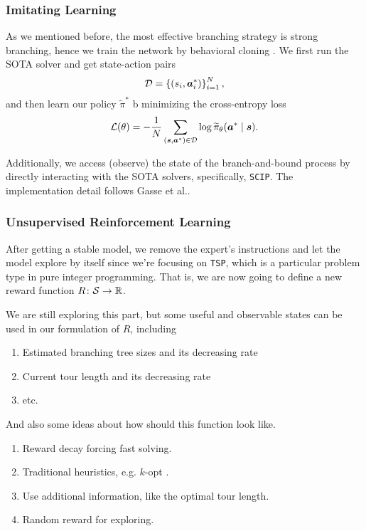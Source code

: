 \documentclass{article}
\begin{document}
\subsubsection{Imitating Learning}
As we mentioned before, the most effective branching strategy is strong branching, hence we train the network by behavioral cloning \cite{Efficient-Training-of-artificial-Neural-Networks-for-Autonomous-Navigation}.
We first run the SOTA solver and get state-action pairs
\[
	\mathcal{\MakeUppercase{d}} = \left\{(s_{i} , \bm{a} _{i} ^\ast)\right\}_{i = 1}^N,
\]
and then learn our policy \(\widetilde{\pi} ^\ast\) b minimizing the cross-entropy loss
\[
	\mathcal{\MakeUppercase{l}} (\theta ) = - \frac{1}{N}\sum\limits_{(\bm{s}, \bm{a}^\ast)\in \mathcal{\MakeUppercase{d}} }\log \widetilde{\pi}_\theta (\bm{a} ^\ast \mid \bm{s} ).
\]

Additionally, we access (observe) the state of the branch-and-bound process by directly interacting with the SOTA solvers, specifically, \texttt{SCIP}. The implementation detail follows Gasse et al.\cite{GasseCFCL19}.

\subsubsection{Unsupervised Reinforcement Learning}
After getting a stable model, we remove the expert's instructions and let the model explore by itself since we're focusing on \texttt{TSP}, which is a particular problem type in pure integer programming. That is, we are now
going to define a new reward function \(R\colon \mathcal{\MakeUppercase{s}} \to \mathbb{\MakeUppercase{r}} \).

We are still exploring this part, but some useful and observable states can be used in our formulation of \(R\), including
\begin{enumerate}
	\item Estimated branching tree sizes and its decreasing rate
	\item Current tour length and its decreasing rate
	\item etc.
\end{enumerate}

And also some ideas about how should this function look like.
\begin{enumerate}
	\item Reward decay forcing fast solving.
	\item Traditional heuristics, e.g. \(k\)-opt \cite{k-opt}.
	\item Use additional information, like the optimal tour length.
	\item Random reward for exploring.
\end{enumerate}
\end{document}
